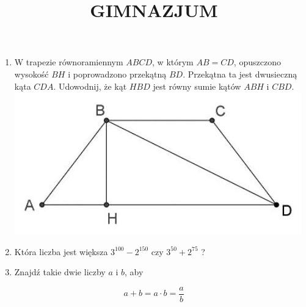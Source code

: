 \documentclass[10pt]{article}
\title{GIMNAZJUM }
\author{}
\date{}
\begin{document}
\maketitle
\begin{enumerate}
  \item W trapezie równoramiennym \(A B C D\), w którym \(A B=C D\), opuszczono wysokość \(B H\) i poprowadzono przekątną \(B D\). Przekątna ta jest dwusieczną kąta \(C D A\). Udowodnij, że kąt \(H B D\) jest równy sumie kątów \(A B H\) i \(C B D\).\\
\includegraphics[max width=\textwidth, center]{2024_11_21_17a8ac2904543f8d31ceg-1(2)}
  \item Która liczba jest większa \(3^{100}-2^{150}\) czy \(3^{50}+2^{75}\) ?
  \item Znajdź takie dwie liczby \(a\) i \(b\), aby
\end{enumerate}

\[
a+b=a \cdot b=\frac{a}{b}
\]
\end{document}
